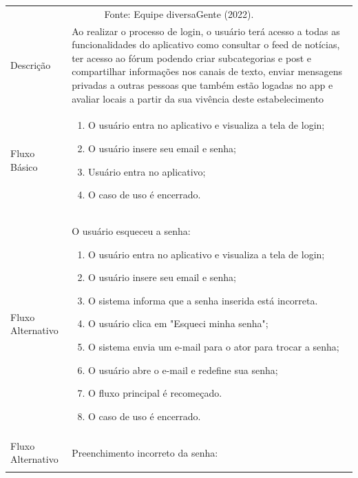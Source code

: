 \begin{apendicesenv}
\begin{quadro}[htb]
	\centering
	\ABNTEXfontereduzida
	\caption[Caso de Uso Fazer Login]{Caso de Uso Fazer Login}
	\label{casos-de-uso1}
\end{quadro}
\begin{longtable}{|p{3.3cm}|p{12.3cm}|}
	\hline
	\thead{} & \thead{Ator} \\
	\hline
	\endfirsthead
	\multicolumn{2}{c}{\scriptsize Fonte: Equipe diversaGente (2022).}%
	{{\bfseries \autoref{casos-de-uso1} continued from previous page}} \\
	\endhead
	Descrição & Ao realizar o processo de login, o usuário terá acesso a todas as funcionalidades do aplicativo como consultar o feed de notícias, ter acesso ao fórum podendo criar subcategorias e post e compartilhar informações nos canais de texto, enviar mensagens privadas a outras pessoas que também estão logadas no app e avaliar locais a partir da sua vivência deste estabelecimento \\
	\hline
	Fluxo Básico  & 
	\begin{enumerate}
		\item O usuário entra no aplicativo e visualiza a tela de login;
		\item O usuário insere seu email e senha;
		\item Usuário entra no aplicativo;
		\item O caso de uso é encerrado. 
	\end{enumerate}\\
	\hline
	Fluxo Alternativo  & O usuário esqueceu a senha:
	\begin{enumerate}
		\item O usuário entra no aplicativo e visualiza a tela de login;
		\item O usuário insere seu email e senha;
		\item O sistema informa que a senha inserida está incorreta.
		\item O usuário clica em "Esqueci minha senha";
		\item O sistema envia um e-mail para o ator para trocar a senha;
		\item O usuário abre o e-mail e redefine sua senha;
		\item O fluxo principal é recomeçado.
		\item O caso de uso é encerrado.
	\end{enumerate} \\
	\hline
	Fluxo Alternativo  &  Preenchimento incorreto da senha:
	\begin{enumerate}

\end{enumerate}
\end{longtable}
\end{apendicesenv}
